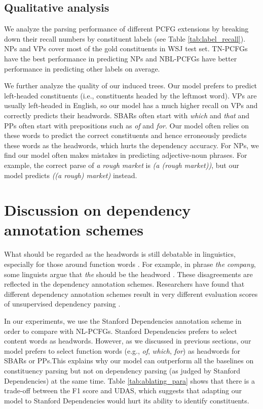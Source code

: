\documentclass[11pt,a4paper]{article}
\begin{document}
\subsection{Qualitative analysis}

We analyze the parsing performance of different PCFG extensions by breaking down their recall numbers by constituent labels (see Table \ref{tab:label_recall}). NPs and VPs cover most of the gold constituents in WSJ test set. TN-PCFGs have the best performance in predicting NPs and NBL-PCFGs have better performance in predicting other labels on average. 

We further analyze the quality of our induced trees. Our model prefers to predict left-headed constituents (i.e., constituents headed by the leftmost word). VPs are usually left-headed in English, so our model has a much higher recall on VPs and correctly predicts their headwords. SBARs often start with \emph{which} and \emph{that} and PPs often start with prepositions such as \emph{of} and \emph{for}. Our model often relies on these words to predict the correct constituents and hence erroneously predicts these words as the headwords, which hurts the dependency accuracy. For NPs, we find our model often makes mistakes in predicting adjective-noun phrases. For example, the correct parse of \emph{a rough market} is \emph{(a (rough market))}, but our model predicts \emph{((a rough) market)} instead.




\section{Discussion on dependency annotation schemes}
What should be regarded as the headwords is still debatable in linguistics, especially for those around function words \cite{Zwicky1993HeadsIG}. For example, in phrase \emph{the company}, some linguists argue that \emph{the} should be the headword \cite{Abney1972TheEN}. These disagreements are reflected in the dependency annotation schemes. 
Researchers have found that different dependency annotation schemes result in very different evaluation scores of unsupervised dependency parsing \cite{DBLP:journals/corr/Noji16, shen2020structformer}. 

In our experiments, we use the Stanford Dependencies annotation scheme in order to compare with NL-PCFGs.
Stanford Dependencies prefers to select content words as headwords.
However, as we discussed in previous sections, our model prefers to select function words (e.g., \emph{of}, \emph{which}, \emph{for}) as headwords for SBARs or PPs.This explains why our model can outperform all the baselines on constituency parsing but not on dependency parsing (as judged by Stanford Dependencies) at the same time. Table \ref{tab:ablating_para} shows that there is a trade-off between the F1 score and UDAS, which suggests that adapting our model to Stanford Dependencies would hurt its ability to identify constituents.
\end{document}
